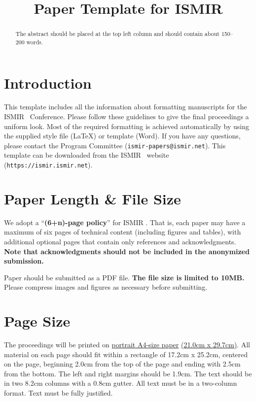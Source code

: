 \documentclass{article}
\title{Paper Template for ISMIR \conferenceyear}
\begin{document}
\maketitle

\begin{abstract}
The abstract should be placed at the top left column and should contain about 150--200 words.
\end{abstract}

\section{Introduction}\label{sec:introduction}

This template includes all the information about formatting manuscripts for the ISMIR \conferenceyear\ Conference. Please follow these guidelines to give the final proceedings a uniform look. Most of the required formatting is achieved automatically by using the supplied style file (\LaTeX) or template (Word). If you have any questions, please contact the Program Committee (\texttt{ismir\conferenceyear-papers@ismir.net}). This template can be downloaded from the ISMIR \conferenceyear\ website (\texttt{https://ismir\conferenceyear.ismir.net}).

\section{Paper Length \& File Size}

We adopt a ``\textbf{(6+n)-page policy}'' for ISMIR \conferenceyear. That is, each paper may have a maximum of six pages of technical content (including figures and tables), with additional optional pages that contain only references and acknowledgments. \textbf{Note that acknowledgments should not be included in the anonymized submission.}

Paper should be submitted as a PDF file. \textbf{The file size is limited to 10MB.} Please compress images and figures as necessary before submitting.

\section{Page Size}\label{sec:page_size}

The proceedings will be printed on \underline{portrait A4-size paper} \underline{(21.0cm x 29.7cm)}. All material on each page should fit within a rectangle of 17.2cm x 25.2cm, centered on the page, beginning 2.0cm from the top of the page and ending with 2.5cm from the bottom. The left and right margins should be 1.9cm. The text should be in two 8.2cm columns with a 0.8cm gutter. All text must be in a two-column format. Text must be fully justified.
\end{document}

